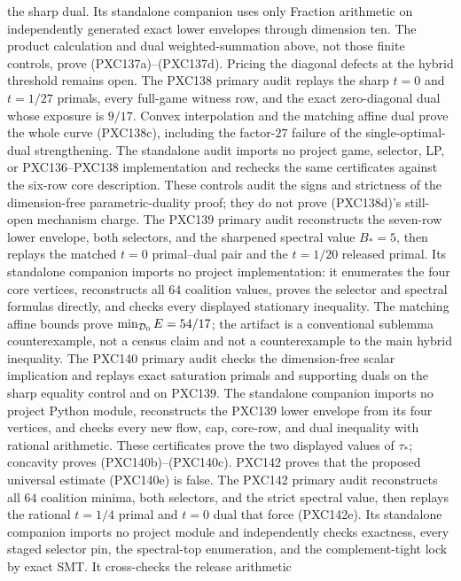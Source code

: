\documentclass[11pt]{article}
\begin{document}
the sharp dual.  Its standalone companion uses only Fraction arithmetic on
independently generated exact lower envelopes through dimension ten.  The
product calculation and dual weighted-summation above, not those finite
controls, prove (PXC137a)--(PXC137d).  Pricing the diagonal defects at the
hybrid threshold remains open.
The PXC138 primary audit replays the sharp \(t=0\) and \(t=1/27\) primals,
every full-game witness row, and the exact zero-diagonal dual whose exposure
is \(9/17\).  Convex interpolation and the matching affine dual prove the
whole curve (PXC138c), including the factor-\(27\) failure of the
single-optimal-dual strengthening.  The standalone audit imports no project
game, selector, LP, or PXC136--PXC138 implementation and rechecks the same
certificates against the six-row core description.  These controls audit the
signs and strictness of the dimension-free parametric-duality proof; they do
not prove (PXC138d)'s still-open mechanism charge.
The PXC139 primary audit reconstructs the seven-row lower envelope, both
selectors, and the sharpened spectral value \(B_*=5\), then replays the
matched \(t=0\) primal--dual pair and the \(t=1/20\) released primal.  Its
standalone companion imports no project implementation: it enumerates the
four core vertices, reconstructs all \(64\) coalition values, proves the
selector and spectral formulas directly, and checks every displayed
stationary inequality.  The matching affine bounds prove
\(\min_{{\cal D}_0}E=54/17\); the artifact is a conventional sublemma
counterexample, not a census claim and not a counterexample to the main
hybrid inequality.
The PXC140 primary audit checks the dimension-free scalar implication and
replays exact saturation primals and supporting duals on the sharp equality
control and on PXC139.  The standalone companion imports no project Python
module, reconstructs the PXC139 lower envelope from its four vertices, and
checks every new flow, cap, core-row, and dual inequality with rational
arithmetic.  These certificates prove the two displayed values of
\(\tau_*\); concavity proves (PXC140b)--(PXC140c).  PXC142 proves that the
proposed universal estimate (PXC140e) is false.
The PXC142 primary audit reconstructs all \(64\) coalition minima, both
selectors, and the strict spectral value, then replays the rational
\(t=1/4\) primal and \(t=0\) dual that force (PXC142e).  Its standalone
companion imports no project module and independently checks exactness,
every staged selector pin, the spectral-top enumeration, and the
complement-tight lock by exact SMT.  It cross-checks the release arithmetic
\end{document}
